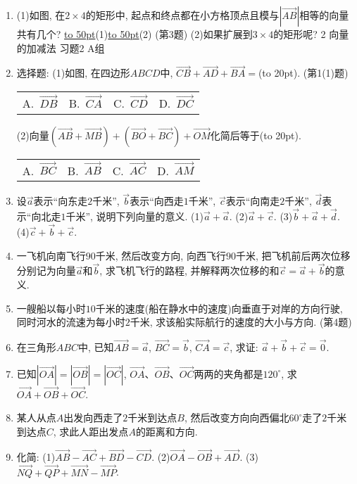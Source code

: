 \documentclass[10pt,a4paper]{article}
\newcommand{\blank}[1]{\underline{\hbox to #1pt{}}}
\newcommand{\bracket}[1]{(\hbox to #1pt{})}
\newcommand{\fourch}[4]{\par\begin{tabular}{p{.23\textwidth}p{.23\textwidth}p{.23\textwidth}p{.23\textwidth}}
A.~#1 &B.~#2& C.~#3& D.~#4
\end{tabular}}
\begin{document}
\begin{enumerate}[1.]
(第2题)
\item (1)如图, 在$2\times 4$的矩形中, 起点和终点都在小方格顶点且模与$|\overrightarrow{AB}|$相等的向量共有几个?
\blank{50}(1)\blank{50}(2)
(第3题)
(2)如果扩展到$3\times 4$的矩形呢?
2  向量的加减法
习题2  A组
\item 选择题:
(1)如图, 在四边形$ABCD$中, $\overrightarrow{CB}+\overrightarrow{AD}+\overrightarrow{BA}=$\bracket{20}.
(第1(1)题)
\fourch{$\overrightarrow{DB}$}{$\overrightarrow{CA}$}{$\overrightarrow{CD}$}{$\overrightarrow{DC}$}
(2)向量$(\overrightarrow{AB}+\overrightarrow{MB})+(\overrightarrow{BO}+\overrightarrow{BC})+\overrightarrow{OM}$化简后等于\bracket{20}.
\fourch{$\overrightarrow{BC}$}{$\overrightarrow{AB}$}{$\overrightarrow{AC}$}{$\overrightarrow{AM}$}
\item 设$\overrightarrow a$表示``向东走$2$千米'', $\overrightarrow b$表示``向西走$1$千米'', $\overrightarrow c$表示``向南走$2$千米'', $\overrightarrow d$表示``向北走$1$千米'', 说明下列向量的意义.
(1)$\overrightarrow a+\overrightarrow a$. (2)$\overrightarrow a+\overrightarrow c$.
(3)$\overrightarrow b+\overrightarrow a+\overrightarrow d$. (4)$\overrightarrow c+\overrightarrow b+\overrightarrow c$.
\item 一飞机向南飞行$90$千米, 然后改变方向, 向西飞行$90$千米, 把飞机前后两次位移分别记为向量$\overrightarrow a$和$\overrightarrow b$, 求飞机飞行的路程, 并解释两次位移的和$\overrightarrow c=\overrightarrow a+\overrightarrow b$的意义.
\item 一艘船以每小时$10$千米的速度(船在静水中的速度)向垂直于对岸的方向行驶, 同时河水的流速为每小时$2$千米, 求该船实际航行的速度的大小与方向.
(第4题)
\item 在三角形$ABC$中, 已知$\overrightarrow{AB}=\overrightarrow a$, $\overrightarrow{BC}=\overrightarrow b$, $\overrightarrow{CA}=\overrightarrow c$, 求证: $\overrightarrow a+\overrightarrow b+\overrightarrow c=\overrightarrow 0$.
\item 已知$|\overrightarrow{OA}|=|\overrightarrow{OB}|=|\overrightarrow{OC}|$, $\overrightarrow{OA}$、$\overrightarrow{OB}$、$\overrightarrow{OC}$两两的夹角都是$120^{\circ }$, 求$\overrightarrow{OA}+\overrightarrow{OB}+\overrightarrow{OC}$.
\item 某人从点$A$出发向西走了$2$千米到达点$B$, 然后改变方向向西偏北$60^{\circ }$走了$2$千米到达点$C$, 求此人距出发点$A$的距离和方向.
\item 化简:
(1)$\overrightarrow{AB}-\overrightarrow{AC}+\overrightarrow{BD}-\overrightarrow{CD}$. (2)$\overrightarrow{OA}-\overrightarrow{OB}+\overrightarrow{AD}$.
(3)$\overrightarrow{NQ}+\overrightarrow{QP}+\overrightarrow{MN}-\overrightarrow{MP}$.

\end{enumerate}
\end{document}
